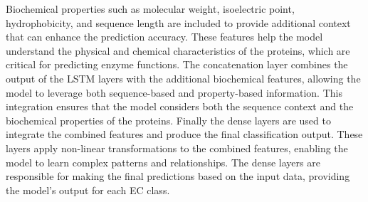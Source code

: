 Biochemical properties such as molecular weight, isoelectric point, hydrophobicity, and sequence length are included to provide additional context that can enhance the prediction accuracy. These features help the model understand the physical and chemical characteristics of the proteins, which are critical for predicting enzyme functions. The concatenation layer combines the output of the LSTM layers with the additional biochemical features, allowing the model to leverage both sequence-based and property-based information. This integration ensures that the model considers both the sequence context and the biochemical properties of the proteins. Finally the dense layers are used to integrate the combined features and produce the final classification output. These layers apply non-linear transformations to the combined features, enabling the model to learn complex patterns and relationships. The dense layers are responsible for making the final predictions based on the input data, providing the model's output for each EC class.